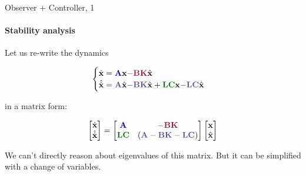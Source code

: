 \documentclass{beamer}
\begin{document}
\begin{frame}{Observer + Controller, 1}
\framesubtitle{Stability analysis}
\begin{flushleft}

Let us re-write the dynamics

\begin{equation}
\begin{cases}
\dot {\bo{x}} = \textcolor{mydarkblue}{\bo{A}} \bo{x} \textcolor{mydarkpink}{- \bo{B} \bo{K}} \hat{\bo{x}} 
\\
\hat{\dot {\bo{x}}} = \textcolor{mydarkgray}{\bo{A}} \hat{\bo{x}} \textcolor{mydarkgray}{- \bo{B} \bo{K}} \hat{\bo{x}} + \textcolor{mydarkgreen}{\bo{L}\bo{C}} \bo{x} \textcolor{mydarkgray}{- \bo{L}\bo{C}} \hat{\bo{x}}
\end{cases}
\end{equation}

in a matrix form:

\begin{equation}
\begin{bmatrix}
\dot {\bo{x}} \\
\hat{\dot {\bo{x}}}
\end{bmatrix}
=
\begin{bmatrix}
\textcolor{mydarkblue}{\bo{A}} & \textcolor{mydarkpink}{-\bo{B}\bo{K}}\\
\textcolor{mydarkgreen}{\bo{L}\bo{C}} & (\textcolor{mydarkgray}{\bo{A} - \bo{B}\bo{K}-\bo{L}\bo{C}})
\end{bmatrix}
\begin{bmatrix}
\bo{x} \\
\hat{\bo{x}}
\end{bmatrix}
\end{equation}

\bigskip

We can't directly reason about eigenvalues of this matrix. But it can be simplified with a change of variables.

\end{flushleft}
\end{frame}
\end{document}
